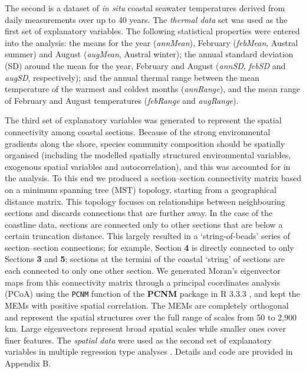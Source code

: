 \documentclass[utf8]{frontiersSCNS} %
\begin{document}
The second is a dataset of \emph{in situ} coastal seawater temperatures \citep{Smit2013} derived from daily measurements over up to 40 years. The \emph{thermal data} set was used as the first set of explanatory variables. The following statistical properties were entered into the analysis: the means for the year (\emph{annMean}), February (\emph{febMean}, Austral summer) and August (\emph{augMean}, Austral winter); the annual standard deviation (SD) around the mean for the year, February and August (\emph{annSD}, \emph{febSD} and \emph{augSD}, respectively); and the annual thermal range between the mean temperature of the warmest and coldest months (\emph{annRange}), and the mean range of February and August temperatures (\emph{febRange} and \emph{augRange}).

The third set of explanatory variables was generated to represent the spatial connectivity among coastal sections. Because of the strong environmental gradients along the shore, species community composition should be spatially organised (including the modelled spatially structured environmental variables, exogenous spatial variables and autocorrelation), and this was accounted for in the analysis. To this end we produced a section--section connectivity matrix based on a minimum spanning tree (MST) topology, starting from a geographical distance matrix. This topology focuses on relationships between neighbouring sections and discards connections that are further away. In the case of the coastline data, sections are connected only to other sections that are below a certain truncation distance. This largely resulted in a `string-of-beads' series of section--section connections; for example, Section \textbf{4} is directly connected to only Sections \textbf{3} and \textbf{5}; sections at the termini of the coastal `string' of sections are each connected to only one other section. We generated Moran's eigenvector maps \citep[MEM;][]{Dray2006,Dray2012a} from this connectivity matrix through a principal coordinates analysis (PCoA) using the \texttt{PCNM} function of the \textbf{PCNM} package in R 3.3.3 \citep{R2017}, and kept the MEMs with positive spatial correlation. The MEMs are completely orthogonal and represent the spatial structures over the full range of scales from 50 to 2,900 km. Large eigenvectors represent broad spatial scales while smaller ones cover finer features. The \emph{spatial data} were used as the second set of explanatory variables in multiple regression type analyses \citep{Dray2012a}. Details and code are provided in Appendix B.
\end{document}
